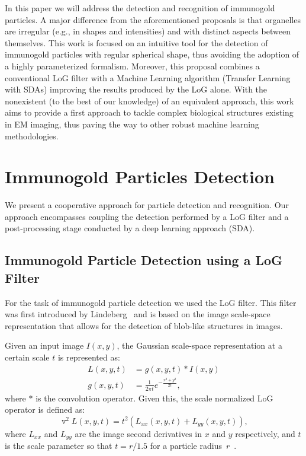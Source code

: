 \documentclass[a4paper,11pt]{article}
\newcommand{\1}{\mathbbm{1}}
\theoremstyle{plain}
\begin{document}
In this paper we will address the detection and recognition of immunogold particles. A major difference from the aforementioned proposals is that organelles are irregular (e.g., in shapes and intensities) and with distinct aspects between themselves. This work is focused on an intuitive tool for the detection of immunogold particles with regular spherical shape, thus avoiding the adoption of a highly parameterized formalism. Moreover, this proposal combines a conventional \ac{LoG} filter with a Machine Learning algorithm (Transfer Learning with SDAs) improving the results produced by the \ac{LoG} alone. With the nonexistent (to the best of our knowledge) of an equivalent approach, this work aims to provide a first approach to tackle complex biological structures existing in \ac{EM} imaging, thus paving the way to other robust machine learning methodologies.


\section{Immunogold Particles Detection}
\label{sec:detection}

We present a cooperative approach for particle detection and recognition. Our approach encompasses coupling the detection performed by a \ac{LoG} filter and a post-processing stage conducted by a deep learning approach (\ac{SDA}).

\subsection{Immunogold Particle Detection using a LoG Filter}

For the task of immunogold particle detection we used the LoG filter. This filter was first introduced by Lindeberg~\cite{Lindeberg} and is based on the image scale-space representation that allows for the detection of blob-like structures in images.

Given an input image $I(x,y)$, the Gaussian scale-space representation at a certain scale $t$ is represented as:
\begin{eqnarray}
  L(x,y,t) & = g(x,y,t) \ast I(x,y) \\
  g(x,y,t) & = \frac{1}{2\pi t} e^{-\frac{x^2 + y^2}{2t}}, \nonumber
\label{eq:scale_space}
\end{eqnarray}
where $\ast$ is the convolution operator. Given this, the scale normalized \ac{LoG} operator is defined as:
\begin{equation}
    \triangledown^2 L(x,y,t) = t^2 (L_{xx}(x,y,t) + L_{yy}(x,y,t)),
\label{eq:log}
\end{equation}
where $L_{xx}$ and $L_{yy}$ are the image second derivatives in $x$ and $y$ respectively, and $t$ is the scale parameter so that $t = r / 1.5 $ for a particle radius~$r$~\cite{TEstevesibpria2013,RGamelasSousaICIAR2015}.
\end{document}
